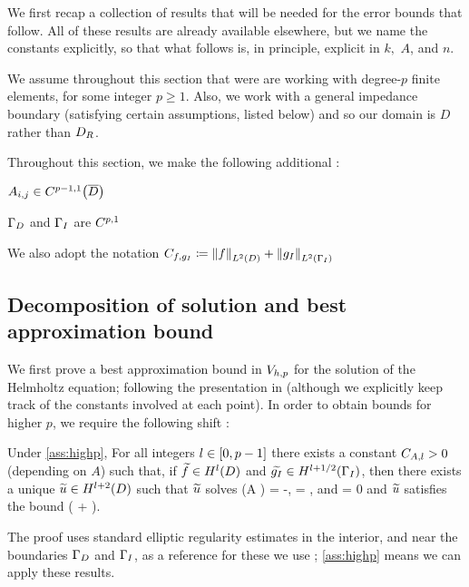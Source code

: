 We first recap a collection of results that will be needed for the error bounds that follow. All of these results are already available elsewhere, but we name the constants explicitly, so that what follows is, in principle, explicit in $k,$ $A$, and $n.$

We assume throughout this section that were are working with degree-$p$ finite elements, for some integer $p \geq 1.$ Also, we work with a general impedance boundary (satisfying certain assumptions, listed below) and so our domain is $D$ rather than $D_{R}$.

Throughout this section, we make the following additional :
\label{ass:highp}
\bit
\item $\Aij \in \CpmooDclos$
\item $\Gamma_{D}$ and $\Gamma_{I}$ are $C^{p,1}$
  \eit
\eas

We also adopt the notation $\Cfg \de \NLtD{f} + \NLtGI{\gI}$

\subsection{Decomposition of solution and best approximation bound}

We first prove a best approximation bound in $V_{h,p}$ for the solution of the Helmholtz equation; following the presentation in \cite{ChNi:18a} (although we explicitly keep track of the constants involved at each point). In order to obtain bounds for higher $p$, we require the following shift :

\label{thm:shift}
Under \cref{ass:highp}, For all integers $l \in \mleft[0,p-1\mright]$ there exists a constant $C_{A,l}>0$ (depending on $A$) such that, if $\ftilde \in \HlD$ and $\gItilde \in \HlphGI$, then there exists a unique $\utilde \in \HlptD$ such that $\widetilde{u}$ solves
\beqs
\grad \cdot \mleft(A \grad \utilde\mright) = -\ftilde,
\eeqs
\beqs
\dn \utilde = \gItilde,
\eeqs
and
\beqs
\trD \utilde = 0
\eeqs
and $\widetilde{u}$ satisfies the bound
\beq\label{eq:shift}
\NHlptD{\utilde} \leq \CAl \mleft(\NHlD{\ftilde} + \NHlphGI{\gItilde}\mright).
\eeq
\enth

The proof uses standard elliptic regularity estimates in the interior, and near the boundaries $\Gamma_{D}$ and $\Gamma_{I}$, as a reference for these we use \cite[pp. 137-138]{Mc:00}; \cref{ass:highp} means we can apply these results.

